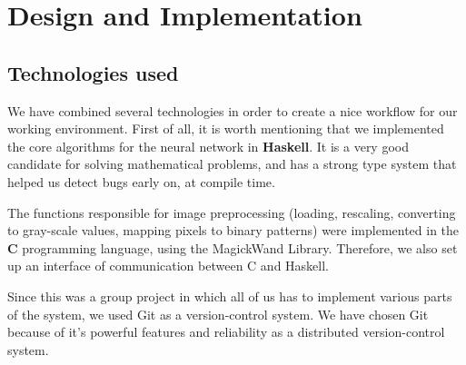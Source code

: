 \chapter{Design and Implementation}

\section{Technologies used}

We have combined several technologies in order to create a nice workflow for our working environment. First of all, it is worth mentioning that we implemented the core algorithms for the neural network in \textbf{Haskell}. It is a very good candidate for solving mathematical problems, and has a strong type system that helped us detect bugs early on, at compile time.

The functions responsible for image preprocessing (loading, rescaling, converting to gray-scale values, mapping pixels to binary patterns) were implemented in the \textbf{C} programming language, using the MagickWand Library. Therefore, we also set up an interface of communication between C and Haskell.

Since this was a group project in which all of us has to implement various parts of the system, we used Git as a version-control system. We have chosen Git because of it's powerful features and reliability as a distributed version-control system.


